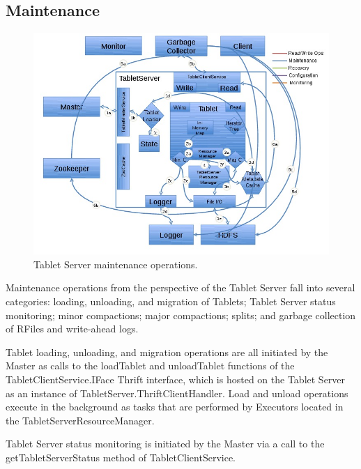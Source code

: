 \documentclass[letterpaper,onecolumn,12pt,titlepage]{article}
\begin{document}
\subsection{Maintenance}
\begin{figure}[htbp]
\center
\includegraphics[scale=.6]{images/tserver_maintenance.jpg}
\caption{\label{fig_ts_maintenance} Tablet Server maintenance operations.}
\end{figure}

Maintenance operations from the perspective of the Tablet Server fall into several categories: loading, unloading, and migration of Tablets; Tablet Server status monitoring; minor compactions; major compactions; splits; and garbage collection of RFiles and write-ahead logs.

Tablet loading, unloading, and migration operations are all initiated by the Master as calls to the loadTablet and unloadTablet functions of the TabletClientService.IFace Thrift interface, which is hosted on the Tablet Server as an instance of TabletServer.ThriftClientHandler.
Load and unload operations execute in the background as tasks that are performed by Executors located in the TabletServerResourceManager.

Tablet Server status monitoring is initiated by the Master via a call to the getTabletServerStatus method of TabletClientService.

\end{document}
